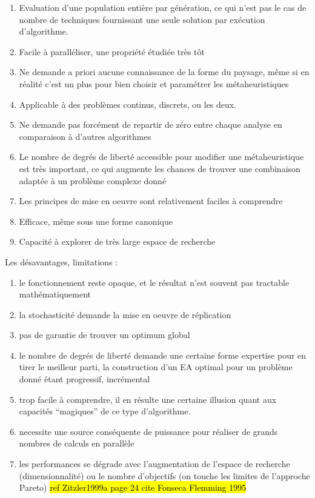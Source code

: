 \begin{enumerate}[label=(\alph*),labelindent=\parindent,leftmargin=*]

	\item Evaluation d'une population entière par génération, ce qui n'est pas le cas de nombre de techniques fournissant une seule solution par exécution d'algorithme.
	\item Facile à paralléliser, une propriété étudiée très tôt \autocite[444]{Alba2002}
	\item Ne demande a priori aucune connaissance de la forme du paysage, même si en réalité c'est un plus pour bien choisir et paramétrer les métaheuristiques
	\item Applicable à des problèmes continus, discrets, ou les deux.
	\item Ne demande pas forcément de repartir de zéro entre chaque analyse en comparaison à d'autres algorithmes
	\item Le nombre de degrés de liberté accessible pour modifier une métaheuristique est très important, ce qui augmente les chances de trouver une combinaison adaptée à un problème complexe donné
	\item Les principes de mise en oeuvre sont relativement faciles à comprendre
    \item Efficace, même sous une forme canonique
    \item Capacité à explorer de très large espace de recherche
\end{enumerate}

Les désavantages, limitations :

\begin{enumerate}[label=(\alph*),labelindent=\parindent,leftmargin=*]
	\item le fonctionnement reste opaque, et le résultat n'est souvent pas tractable mathématiquement
	\item la stochasticité demande la mise en oeuvre de réplication
	\item pas de garantie de trouver un optimum global
	\item le nombre de degrés de liberté demande une certaine forme expertise pour en tirer le meilleur parti, la construction d'un EA optimal pour un problème donné étant progressif, incrémental
    \item trop facile à comprendre, il en résulte une certaine illusion quant aux capacités \enquote{magiques} de ce type d'algorithme.
    \item necessite une source conséquente de puissance pour réaliser de grands nombres de calculs en parallèle
    \item les performances se dégrade avec l'augmentation de l'espace de recherche (dimensionnalité) ou le nombre d'objectifs (on touche les limites de l'approche Pareto) \hl{ref Zitzler1999a page 24 cite Fonseca Flemming 1995}
\end{enumerate}

